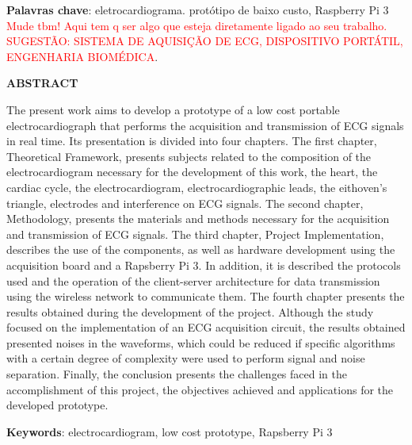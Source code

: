 \documentclass[12pt, a4paper]{article}
\begin{document}
\textbf{Palavras chave}: eletrocardiograma. protótipo de baixo custo, Raspberry Pi 3 \textcolor{red}{Mude tbm! Aqui tem q ser algo que esteja diretamente ligado ao seu trabalho. SUGESTÃO: SISTEMA DE AQUISIÇÃO DE ECG, DISPOSITIVO PORTÁTIL, ENGENHARIA BIOMÉDICA}.  
\newpage
\thispagestyle{empty}
\vspace*{4.4cm}
{\begin{center}\textbf{\normalsize ABSTRACT}\vspace{36pt}\end{center}}
The present work aims to develop a prototype of a low cost portable electrocardiograph that performs the acquisition and transmission of ECG signals in real time. Its presentation is divided into four chapters. The first chapter, Theoretical Framework, presents subjects related to the composition of the electrocardiogram necessary for the development of this work, the heart, the cardiac cycle, the electrocardiogram, electrocardiographic leads, the eithoven’s triangle, electrodes and interference on ECG signals. The second chapter, Methodology, presents the materials and methods necessary for the acquisition and transmission of ECG signals. The third chapter, Project Implementation, describes the use of the components, as well as hardware development using the acquisition board and a Rapsberry Pi 3. In addition, it is described the protocols used and the operation of the client-server architecture for data transmission using the wireless network to communicate them. The fourth chapter presents the results obtained during the development of the project. Although the study focused on the implementation of an ECG acquisition circuit, the results obtained presented noises in the waveforms, which could be reduced if specific algorithms with a certain degree of complexity were used to perform signal and noise separation. Finally, the conclusion presents the challenges faced in the accomplishment of this project, the objectives achieved and applications for the developed prototype.


\textbf{Keywords}: electrocardiogram, low cost prototype, Rapsberry Pi 3



\newpage
\pagestyle{empty}
\vspace*{4cm}
\listoffigures
\clearpage



\newpage
\pagestyle{empty}
\vspace*{3.5cm}
\renewcommand{\contentsname}{\begin{center}\textbf{\normalsize SUMÁRIO}\vspace{36pt}\end{center}}
\tableofcontents
\clearpage
\pagestyle{myheadings}
\end{document}
